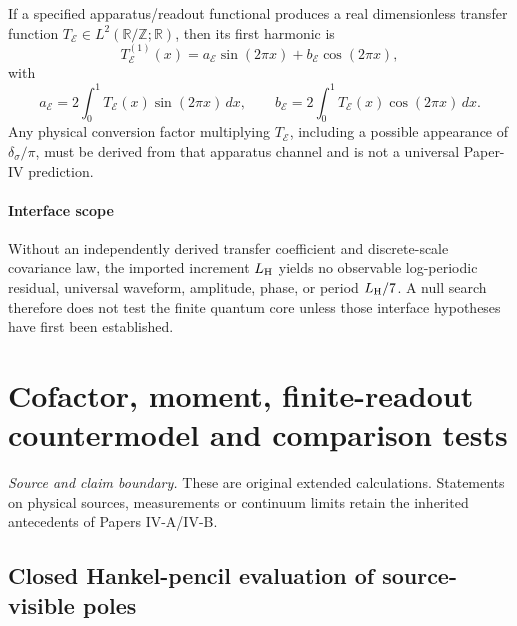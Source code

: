 \documentclass[12pt,a4paper]{article}
\begin{document}
\begin{corollary}
\label{p4:cor:reeb-apparatus-overlap-interface}
If a specified apparatus/readout functional produces a real dimensionless transfer
function \(T_{\mathcal E}\in L^2(\mathbb R/\mathbb Z;\mathbb R)\), then its first harmonic is
\[
T_{\mathcal E}^{(1)}(x)
=a_{\mathcal E}\sin(2\pi x)+b_{\mathcal E}\cos(2\pi x),
\]
with
\[
a_{\mathcal E}=2\int_0^1T_{\mathcal E}(x)\sin(2\pi x)\,dx,
\qquad
b_{\mathcal E}=2\int_0^1T_{\mathcal E}(x)\cos(2\pi x)\,dx.
\]
Any physical conversion factor multiplying \(T_{\mathcal E}\), including a possible
appearance of \(\delta_\sigma/\pi\), must be derived from that apparatus channel and is not a
universal Paper-IV prediction.
\end{corollary}



\paragraph{Interface scope}
\label{p4:sec:part3-null-result}

Without an independently derived transfer coefficient and discrete-scale covariance law, the imported increment \(L_{\rm H}\) yields no observable log-periodic residual, universal waveform, amplitude, phase, or period \(L_{\rm H}/7\).  A null search therefore does not test the finite quantum core unless those interface hypotheses have first been established.



\section{Cofactor, moment, finite-readout countermodel and comparison tests}
\label{p4c:sec:v238-c7}
\noindent\textit{Source and claim boundary.} These are original extended calculations. Statements on physical sources, measurements or continuum limits retain the inherited antecedents of Papers IV-A/IV-B.

\subsection{Closed Hankel-pencil evaluation of source-visible poles}
\label{p4:subsec:v2188-source-moment-pencil}
\end{document}
